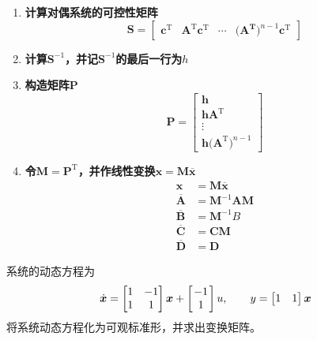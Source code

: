 \example[系统转化为可观测标准形]
\vspace*{-1em}
\begin{enumerate}[\textbf{步骤} 1 ]
	\item \textbf{计算对偶系统的可控性矩阵}
	\begin{equation}
		\bm{S} = 
		\begin{bmatrix}
			\bm{c}^{\text{T}} & \bm{A}^{\text{T}}\bm{c}^{\text{T}} & \cdots & \big(\bm{A^{\text{T}}}\big)^{n-1}\bm{c}^{\text{T}}
		\end{bmatrix} 
	\end{equation}
	\item \textbf{计算$\bm{S}^{-1}$，并记$\bm{S}^{-1}$的最后一行为$h$}
	\item \textbf{构造矩阵$\bm{P}$}
	\begin{equation}
		\bm{P} = 
		\begin{bmatrix}
			\bm{h}\\
			\bm{h}\bm{A}^{\text{T}}\\
			\vdots\\
			\bm{h}\big(\bm{A}^{\text{T}}\big)^{n-1}
		\end{bmatrix}
	\end{equation}
	\item \textbf{令$\bm{M} = \bm{P}^{\text{T}}$，并作线性变换$\bm{x} = \bm{M}\overline{\bm{x}}$}
	\begin{align}
		\bm{x} &= \bm{M}\overline{\bm{x}}\\
		\overline{\bm{A}} & = \bm{M}^{-1}\bm{AM}\\
		\overline{\bm{B}} & = \bm{M}^{-1}B\\
		\overline{\bm{C}} & = \bm{C}\bm{M}\\
		\overline{\bm{D}} & = \bm{D}
	\end{align}
\end{enumerate}

\examples 系统的动态方程为
\begin{equation*}
	\dot{\bm{x}} = 
	\begin{bmatrix}
		1 & -1\\
		1 & 1
	\end{bmatrix}
	\bm{x}
	+
	\begin{bmatrix}
		-1 \\
		\hspace*{0.5em} 1 \hspace*{0.5em}
	\end{bmatrix}
	u,
	\qquad
	y =
	\begin{bmatrix}
		1 & 1
	\end{bmatrix}
	\bm{x}
\end{equation*}
将系统动态方程化为可观标准形，并求出变换矩阵。

